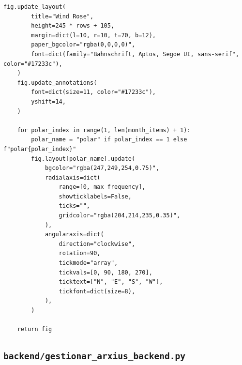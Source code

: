 \documentclass[10pt,a4paper]{article}
\begin{document}
\begin{lstlisting}[style=studioPython,caption={backend/epw\_figures.py},label={lst:backend-epw-figures-py}]
    fig.update_layout(
        title="Wind Rose",
        height=245 * rows + 105,
        margin=dict(l=10, r=10, t=70, b=12),
        paper_bgcolor="rgba(0,0,0,0)",
        font=dict(family="Bahnschrift, Aptos, Segoe UI, sans-serif", color="#17233c"),
    )
    fig.update_annotations(
        font=dict(size=11, color="#17233c"),
        yshift=14,
    )

    for polar_index in range(1, len(month_items) + 1):
        polar_name = "polar" if polar_index == 1 else f"polar{polar_index}"
        fig.layout[polar_name].update(
            bgcolor="rgba(247,249,254,0.75)",
            radialaxis=dict(
                range=[0, max_frequency],
                showticklabels=False,
                ticks="",
                gridcolor="rgba(204,214,235,0.35)",
            ),
            angularaxis=dict(
                direction="clockwise",
                rotation=90,
                tickmode="array",
                tickvals=[0, 90, 180, 270],
                ticktext=["N", "E", "S", "W"],
                tickfont=dict(size=8),
            ),
        )

    return fig
\end{lstlisting}


\subsection{\texorpdfstring{\texttt{backend/gestionar\_arxius\_backend.py}}{backend/gestionar\_arxius\_backend.py}}
\end{document}
